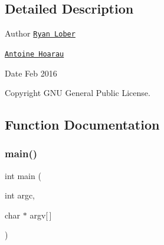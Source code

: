 \subsection{Detailed Description}
\begin{DoxyAuthor}{Author}
\href{http://www.ryanlober.com}{\tt Ryan Lober} 

\href{http://ahoarau.github.io}{\tt Antoine Hoarau} 
\end{DoxyAuthor}
\begin{DoxyDate}{Date}
Feb 2016 
\end{DoxyDate}
\begin{DoxyCopyright}{Copyright}
G\+NU General Public License. 
\end{DoxyCopyright}


\subsection{Function Documentation}
\hypertarget{stepping-demo_8cpp_a0ddf1224851353fc92bfbff6f499fa97}{}\label{stepping-demo_8cpp_a0ddf1224851353fc92bfbff6f499fa97} 
\subsubsection{\texorpdfstring{main()}{main()}}
{\footnotesize\ttfamily int main (\begin{DoxyParamCaption}\item[{int}]{argc,  }\item[{char $\ast$}]{argv\mbox{[}$\,$\mbox{]} }\end{DoxyParamCaption})}


